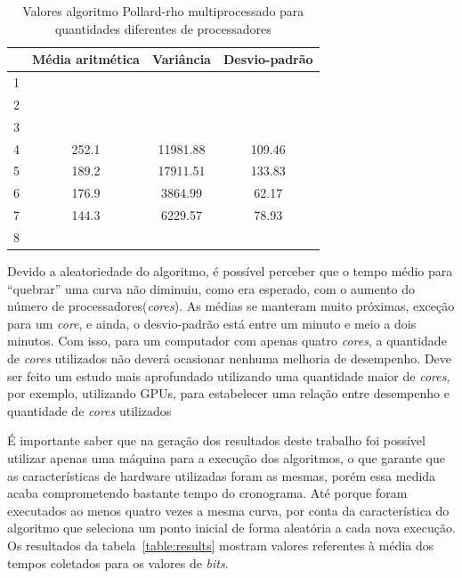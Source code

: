 \begin{table}[h]
\centering
\begin{tabular}{|l|c|c|c|}
\hline
\rowcolor[gray]{0.9}
\multicolumn{1}{|c|}{\textbf{Cores}} & \textbf{Média aritmética}  & \textbf{Variância} & \textbf{Desvio-padrão} \\ \hline
1                                    &                            &                    &                        \\ \hline
2                                    &                            &                    &                        \\ \hline
3                                    &                            &                    &                        \\ \hline
4                                    & 252.1                      & 11981.88           & 109.46                 \\ \hline
5                                    & 189.2                      & 17911.51           & 133.83                 \\ \hline
6                                    & 176.9                      & 3864.99            &  62.17                 \\ \hline
7                                    & 144.3                      & 6229.57            &  78.93                 \\ \hline
8                                    &                            &                    &                        \\ \hline
\end{tabular}
\caption{Valores algoritmo Pollard-rho multiprocessado para quantidades diferentes de processadores}
\label{table:estatistica_mproc}
\end{table}

Devido a aleatoriedade do algoritmo, é possível perceber que o tempo médio para ``quebrar'' uma curva não diminuiu, como era esperado, com o aumento do número de processadores(\textit{cores}). As médias se manteram muito próximas, exceção para um \textit{core}, e ainda, o desvio-padrão está entre um minuto e meio a dois minutos. Com isso, para um computador com apenas quatro \textit{cores}, a quantidade de \textit{cores} utilizados não deverá ocasionar nenhuma melhoria de desempenho. Deve ser feito um estudo mais aprofundado utilizando uma quantidade maior de \textit{cores}, por exemplo, utilizando GPUs, para estabelecer uma relação entre desempenho e quantidade de \textit{cores} utilizados

É importante saber que na geração dos resultados deste trabalho foi possível utilizar apenas uma máquina para a execução dos algoritmos, o que garante que as características de hardware utilizadas foram as mesmas, porém essa medida acaba comprometendo bastante tempo do cronograma. Até porque foram executados ao menos quatro vezes a mesma curva, por conta da característica do algoritmo que seleciona um ponto inicial de forma aleatória a cada nova execução. Os resultados da tabela~\ref{table:results} mostram valores referentes à média dos tempos coletados para os valores de \textit{bits}.
